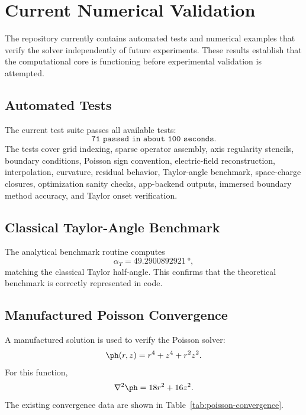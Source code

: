 \section{Current Numerical Validation}

The repository currently contains automated tests and numerical examples that verify the solver independently of future experiments. These results establish that the computational core is functioning before experimental validation is attempted.

\subsection{Automated Tests}

The current test suite passes all available tests:
\begin{equation*}
\texttt{71 passed in about 100 seconds}.
\end{equation*}
The tests cover grid indexing, sparse operator assembly, axis regularity stencils, boundary conditions, Poisson sign convention, electric-field reconstruction, interpolation, curvature, residual behavior, Taylor-angle benchmark, space-charge closures, optimization sanity checks, app-backend outputs, immersed boundary method accuracy, and Taylor onset verification.

\subsection{Classical Taylor-Angle Benchmark}

The analytical benchmark routine computes
\begin{equation*}
\alpha_T = \SI{49.2900892921}{\degree},
\end{equation*}
matching the classical Taylor half-angle. This confirms that the theoretical benchmark is correctly represented in code.

\subsection{Manufactured Poisson Convergence}

A manufactured solution is used to verify the Poisson solver:
\begin{equation}
\ph(r,z)=r^4+z^4+r^2z^2.
\end{equation}
For this function,
\begin{equation}
\nabla^2\ph=18r^2+16z^2.
\end{equation}
The existing convergence data are shown in Table~\ref{tab:poisson-convergence}.

